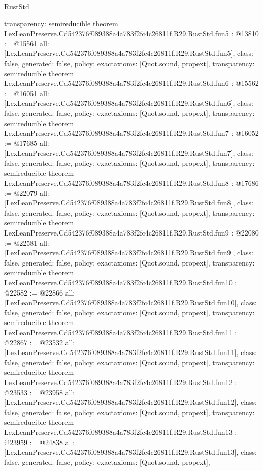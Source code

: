 \begin{lexlean}{RustStd}
\begin{coremodule}
{  transparency: semireducible
}
theorem LexLeanPreserve.Cd542376f089388a4a783f2fc4c26811f.R29.RustStd.fun5 : @13810 := @15561 {
  all: [LexLeanPreserve.Cd542376f089388a4a783f2fc4c26811f.R29.RustStd.fun5],
  class: false,
  generated: false,
  policy: exact{axioms: [Quot.sound, propext]},
  transparency: semireducible
}
theorem LexLeanPreserve.Cd542376f089388a4a783f2fc4c26811f.R29.RustStd.fun6 : @15562 := @16051 {
  all: [LexLeanPreserve.Cd542376f089388a4a783f2fc4c26811f.R29.RustStd.fun6],
  class: false,
  generated: false,
  policy: exact{axioms: [Quot.sound, propext]},
  transparency: semireducible
}
theorem LexLeanPreserve.Cd542376f089388a4a783f2fc4c26811f.R29.RustStd.fun7 : @16052 := @17685 {
  all: [LexLeanPreserve.Cd542376f089388a4a783f2fc4c26811f.R29.RustStd.fun7],
  class: false,
  generated: false,
  policy: exact{axioms: [Quot.sound, propext]},
  transparency: semireducible
}
theorem LexLeanPreserve.Cd542376f089388a4a783f2fc4c26811f.R29.RustStd.fun8 : @17686 := @22079 {
  all: [LexLeanPreserve.Cd542376f089388a4a783f2fc4c26811f.R29.RustStd.fun8],
  class: false,
  generated: false,
  policy: exact{axioms: [Quot.sound, propext]},
  transparency: semireducible
}
theorem LexLeanPreserve.Cd542376f089388a4a783f2fc4c26811f.R29.RustStd.fun9 : @22080 := @22581 {
  all: [LexLeanPreserve.Cd542376f089388a4a783f2fc4c26811f.R29.RustStd.fun9],
  class: false,
  generated: false,
  policy: exact{axioms: [Quot.sound, propext]},
  transparency: semireducible
}
theorem LexLeanPreserve.Cd542376f089388a4a783f2fc4c26811f.R29.RustStd.fun10 : @22582 := @22866 {
  all: [LexLeanPreserve.Cd542376f089388a4a783f2fc4c26811f.R29.RustStd.fun10],
  class: false,
  generated: false,
  policy: exact{axioms: [Quot.sound, propext]},
  transparency: semireducible
}
theorem LexLeanPreserve.Cd542376f089388a4a783f2fc4c26811f.R29.RustStd.fun11 : @22867 := @23532 {
  all: [LexLeanPreserve.Cd542376f089388a4a783f2fc4c26811f.R29.RustStd.fun11],
  class: false,
  generated: false,
  policy: exact{axioms: [Quot.sound, propext]},
  transparency: semireducible
}
theorem LexLeanPreserve.Cd542376f089388a4a783f2fc4c26811f.R29.RustStd.fun12 : @23533 := @23958 {
  all: [LexLeanPreserve.Cd542376f089388a4a783f2fc4c26811f.R29.RustStd.fun12],
  class: false,
  generated: false,
  policy: exact{axioms: [Quot.sound, propext]},
  transparency: semireducible
}
theorem LexLeanPreserve.Cd542376f089388a4a783f2fc4c26811f.R29.RustStd.fun13 : @23959 := @24838 {
  all: [LexLeanPreserve.Cd542376f089388a4a783f2fc4c26811f.R29.RustStd.fun13],
  class: false,
  generated: false,
  policy: exact{axioms: [Quot.sound, propext]},
}
\end{coremodule}
\end{lexlean}
